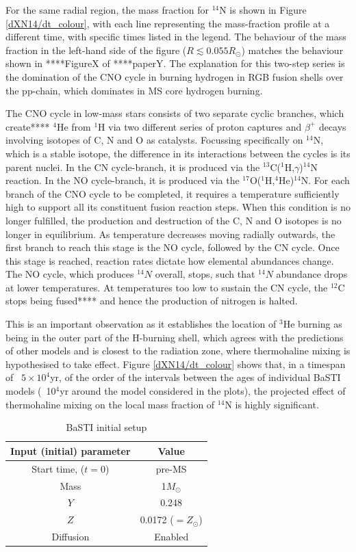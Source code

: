 \documentclass[12pt, a4paper]{report}
\begin{document}
For the same radial region, the mass fraction for $^{14}$N is shown in Figure \ref{dXN14/dt_colour}, with each line representing the mass-fraction profile at a different time, with specific times listed in the legend. The behaviour of the mass fraction in the left-hand side of the figure ($R \lesssim 0.055R_{\odot}$) matches the behaviour shown in ****FigureX of ****paperY. The explanation for this two-step series is the domination of the CNO cycle in burning hydrogen in RGB fusion shells over the pp-chain, which dominates in MS core hydrogen burning. 

The CNO cycle in low-mass stars consists of two separate cyclic branches, which create**** $^{4}$He from $^{1}$H via two different series of proton captures and $\beta ^{+}$ decays involving isotopes of C, N and O as catalysts. Focussing specifically on $^{14}$N, which is a stable isotope, the difference in its interactions between the cycles is its parent nuclei. In the CN cycle-branch, it is produced via the $^{13}$C($^{1}$H,$\gamma$)$^{14}$N reaction. In the NO cycle-branch, it is produced via the $^{17}$O($^{1}$H,$^{4}$He)$^{14}$N. For each branch of the CNO cycle to be completed, it requires a temperature sufficiently high to support all its constituent fusion reaction steps. When this condition is no longer fulfilled, the production and destruction of the C, N and O isotopes is no longer in equilibrium. As temperature decreases moving radially outwards, the first branch to reach this stage is the NO cycle, followed by the CN cycle. Once this stage is reached, reaction rates dictate how elemental abundances change. The NO cycle, which produces $^{14}N$ overall, stops, such that $^{14}N$ abundance drops at lower temperatures. At temperatures too low to sustain the CN cycle, the $^{12}$C stops being fused**** and hence the production of nitrogen is halted.

This is an important observation as it establishes the location of $^{3}$He burning as being in the outer part of the H-burning shell, which agrees with the predictions of other models and is closest to the radiation zone, where thermohaline mixing is hypothesised to take effect. Figure \ref{dXN14/dt_colour} shows that, in a timespan of ~$5 \times 10^{4}$yr, of the order of the intervals between the ages of individual BaSTI models (~10$^{4}$yr around the model considered in the plots), the projected effect of thermohaline mixing on the local mass fraction of $^{14}$N is highly significant.


\begin{table}
\begin{tabular}{cc}
\hline
Input (initial) parameter & Value \\
\hline
Start time, ($t=0$) & pre-MS \\
Mass & 1$M_{\odot}$ \\
$Y$ & 0.248 \\
$Z$ & 0.0172 ($=Z_{\odot}$) \\
Diffusion & Enabled \\
\hline
\end{tabular}
\caption{BaSTI initial setup}
\label{basti_params}
\end{table}
\end{document}
